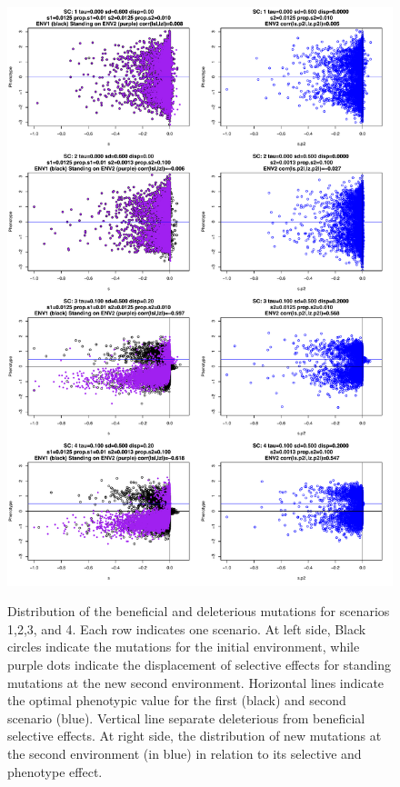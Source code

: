 \documentclass[a4paper,11pt]{article}
\begin{document}
\begin{figure}[h]
{\includegraphics[scale=0.45]{./Dist_ALLScenarios1.pdf}}
\caption{Distribution of the beneficial and deleterious mutations for scenarios 1,2,3, and 4. Each row indicates one scenario. At left side, Black circles indicate the mutations for the initial environment, while purple dots indicate the displacement of selective effects for standing mutations at the new second environment. Horizontal lines indicate the optimal phenotypic value for the first (black) and second scenario (blue). Vertical line separate deleterious from beneficial selective effects. At right side, the distribution of new mutations at the second environment (in blue) in relation to its selective and phenotype effect.}
\label{DistALLScenarios1}
\hspace*{-0.5cm}
\end{figure}
\end{document}
